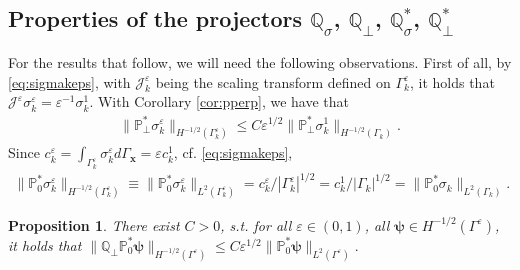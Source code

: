 \documentclass[]{article}
\newtheorem{proposition}{Proposition}
\numberwithin{equation}{section}
\numberwithin{theorem}{section}
\numberwithin{lemma}{section}
\numberwithin{corollary}{section}
\numberwithin{proposition}{section}
\numberwithin{definition}{section}
\newcommand{\bx}{\boldsymbol{x}}
\newcommand{\re}{\varepsilon}
\begin{document}
\begin{appendices}
		\section{Properties of the projectors $\mathbb{Q}_{\sigma}$, $\mathbb{Q}_{\perp}$,  $\mathbb{Q}^*_{\sigma}$, $\mathbb{Q}^*_{\perp}$}
		\label{app:prop_proj_Q}
		For the results that follow, we will need the following observations. 
		First of all, by \eqref{eq:sigmakeps}, with $\mathcal{J}^{\re}_k$ being the scaling transform defined on $\Gamma_k^{\re}$, it holds that $\mathcal{J}^{\re}\sigma_k^{\re}=\re^{-1}\sigma_k^1$. With Corollary \ref{cor:pperp}, we have that  
		\begin{align}
			\label{eq:pperpsigma}
			\|\mathbb{P}_{\perp}^*\sigma_k^{\re}\|_{H^{-1/2}(\Gamma^{\re}_k)}\leq C \re^{1/2}\|\mathbb{P}_{\perp}^*\sigma_k^1\|_{H^{-1/2}(\Gamma_k)}.
		\end{align}
		Since $c_k^{\re}=\int_{\Gamma_k^{\re}}\sigma_k^{\re}d\Gamma_{\bx}=\re c_k^1$, cf. \eqref{eq:sigmakeps}, 
		\begin{align}
			\label{eq:pp0sigma}
			\|\mathbb{P}_0^*\sigma_k^{\re}\|_{H^{-1/2}(\Gamma^{\re}_k)}\equiv		\|\mathbb{P}_0^*\sigma_k^{\re}\|_{L^2(\Gamma^{\re}_k)}=c_k^{\re}/|\Gamma_k^{\re}|^{1/2}=c_k^1/|\Gamma_k|^{1/2}=	\|\mathbb{P}_0^*\sigma_k\|_{L^2(\Gamma_k)}.
		\end{align}
		\begin{proposition}
			\label{prop:bound_Q_perp_P_dual_0}
			There exist $C>0$, s.t. for all $\re \in (0,1)$, all $\boldsymbol{\psi} \in H^{-1/2}(\Gamma^{\re})$, it holds that $
			\| \mathbb{Q}_{\perp} \mathbb{P}^*_0 \boldsymbol{\psi} \|_{H^{-1/2}(\Gamma^{\re})} \leq C \re^{1/2} \| \mathbb{P}^*_0 \boldsymbol{\psi} \|_{L^2(\Gamma^{\re})}.$
		\end{proposition}
		

\end{appendices}
\end{document}
